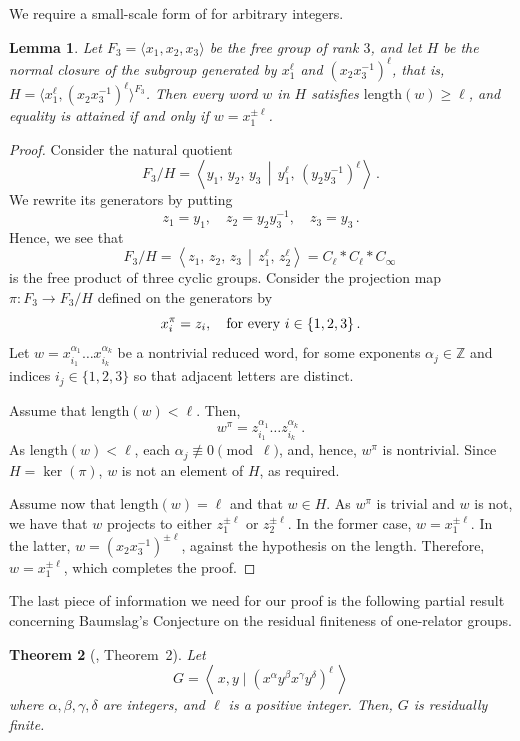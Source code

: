 \documentclass[a4paper]{amsart}
\newcommand{\len}{\mathrm{length}}
\newcommand{\Z}{\mathbb{Z}}
\newcommand{\0}{\mathbf{0}}
\newtheorem{thm}{Theorem}[]
\newtheorem{lemma}[thm]{Lemma}
\theoremstyle{definition}
\begin{document}
We require a small-scale form of  for arbitrary integers.

\begin{lemma}
\label{lem: powers 1}
Let $F_3 = \langle x_1, x_2, x_3 \rangle$ be the free group of rank $3$, and let $H$ be the normal closure of the subgroup generated by $x_1^\ell$ and $(x_2x_3^{-1})^\ell$, that is, $H = \langle x_1^\ell, (x_2x_3^{-1})^\ell \rangle^{F_3}$. Then every word $w$ in $H$ satisfies $\len(w) \geq \ell$, and equality is attained if and only if $w = x_1^{\pm \ell}$.
\end{lemma}
\begin{proof}
Consider the natural quotient 
\[ F_3/H = \left\langle y_1, \, y_2, \, y_3 \,\middle\vert\, y_1^{\ell}, \, \left(y_2y_3^{-1} \right)^\ell \right\rangle \,.\]
We rewrite its generators by putting
\[z_1 = y_1 , \quad z_2=y_2y_3^{-1} , \quad z_3=y_3 \,.\]
Hence, we see that
\[ F_3/H = \left\langle  z_1, \, z_2, \, z_3 \,\middle\vert\, z_1^\ell, \, z_2^\ell  \right\rangle = C_\ell * C_\ell * C_\infty \,\]
is the free product of three cyclic groups. 
Consider the projection map $\pi: F_3 \to F_3/H$ defined on the generators by
\[x_i ^\pi = z_i, \quad \hbox{for every } i\in\{1,2,3\} \,.\]
Let $w = x_{i_1}^{\alpha_1} \dots x_{i_k}^{\alpha_k}$ be a nontrivial reduced word, for some exponents $\alpha_j \in \Z$ and indices $i_j \in \{1, 2, 3 \}$ so that adjacent letters are distinct.

Assume that $\len(w) < \ell$. Then,
\[ w^\pi = z_{i_1}^{\alpha_{1}} \dots z_{i_k}^{\alpha_k} \,.\]
As $\len(w) < \ell$, each $\alpha_j \not\equiv 0 \pmod{\ell}$, and, hence, $w^\pi$ is nontrivial. Since $H=\ker(\pi)$, $w$ is not an element of $H$, as required.

Assume now that $\len(w)=\ell$ and that $w \in H$. As $w^\pi$ is trivial and $w$ is not, we have that $w$ projects to either $z_1^{\pm\ell}$ or $z_2^{\pm\ell}$. In the former case, $w = x_1^{\pm \ell}$. In the latter,  $w = (x_2x_3^{-1})^{\pm \ell}$, against the hypothesis on the length. Therefore, $w=x_1^{\pm\ell}$, which completes the proof.
\end{proof}

The last piece of information we need for our proof is the following partial result  concerning Baumslag's Conjecture on the residual finiteness of one-relator groups.
\begin{thm}[\cite{AT}, Theorem~2]
\label{thm: AT}
    Let
    \[ G = \left\langle \, x, y \mid (x^\alpha y^\beta x^\gamma y^\delta)^\ell \, \right\rangle \]
    where $\alpha, \beta, \gamma, \delta$ are integers, and $\ell$ is a positive integer. Then, $G$ is residually finite.
\end{thm}
\end{document}
